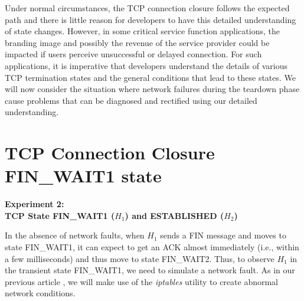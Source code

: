 \begin{multicols}{2}
Under normal circumstances, the TCP connection closure follows the expected path and there is little reason for developers to have this detailed understanding of state changes. However, in some critical service function applications, the branding image and possibly the revenue of the service provider could be impacted if users perceive unsuccessful or delayed connection. For such applications, it is imperative that developers understand the details of various TCP termination states and the general conditions that lead to these states. We will now consider the situation where network failures during the teardown phase cause problems that can be diagnosed and rectified using our detailed understanding.

\section{TCP Connection Closure\\ FIN\_WAIT1 state}

\noindent
\textbf{Experiment 2:\\ TCP State FIN\_WAIT1 (\boldmath$H_{1}$) and ESTABLISHED ($H_{2}$)}
\smallskip

In the absence of network faults, when $H_{1}$ sends a FIN message and moves to state FIN\_WAIT1, it can expect to get an ACK almost immediately (i.e., within a few milliseconds) and thus move to state FIN\_WAIT2. Thus, to observe $H_{1}$ in the transient state FIN\_WAIT1, we need to simulate a network fault. As in our previous article \cite{chap3-key8}, we will make use of the \textit{iptables} utility to create abnormal network conditions.


\end{multicols}
